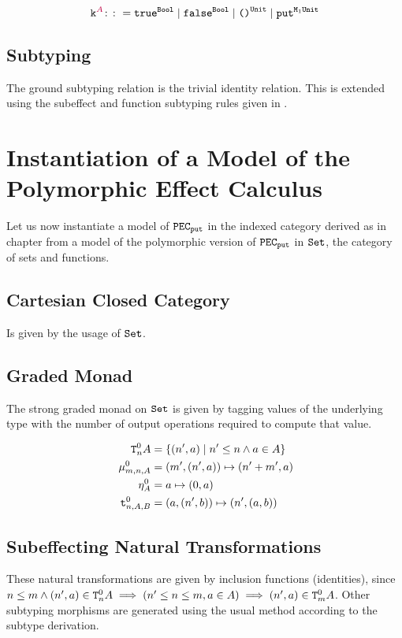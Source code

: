 \documentclass{Report}
\newcommand{\pecput}[0]{\texttt{PEC}_\put}
\begin{document}
    \begin{equation}
        \label{AdequacyConstants}
        \texttt{k}^{\color{purple} A} \colon\colon= \texttt{true}^{\texttt{Bool}} \mid \texttt{false}^{\texttt{Bool}} \mid \texttt{()}^{\texttt{Unit}} \mid \texttt{put}^{\texttt{M}_{1}{\texttt{Unit}}}        
    \end{equation}

    \subsection{Subtyping}
    The ground subtyping relation is the trivial identity relation. This is extended using the subeffect and function subtyping rules given in .


    \section{Instantiation of a Model of the Polymorphic Effect Calculus}

    Let us now instantiate a model of $\pecput$ in the indexed category derived as in chapter  from a model of the polymorphic version of $\pecput$ in $\texttt{Set}$, the category of sets and functions.

    \subsection{Cartesian Closed Category}
    Is given by the usage of $\texttt{Set}$.
    
    \subsection{Graded Monad}
    The strong graded monad on $\texttt{Set}$ is given by tagging values of the underlying type with the number of output operations required to compute that value.

    \begin{align}
        \label{AdequacyGradedMonad}
        \texttt{T}^0_{n}A & = \{(n', a) \mid n'\leq n\wedge a\in A \}\\
        \mu_{m, n, A}^0 & = (m', (n', a))\mapsto (n' + m', a)\\
        \eta_{A}^0 & = a\mapsto (0, a)\\\
        \texttt{t}_{n, A, B}^0 & = (a, (n', b)) \mapsto (n', (a, b))
    \end{align}


\subsection{Subeffecting Natural Transformations}
These natural transformations are given by inclusion functions (identities), since $n\leq m\wedge (n',a)\in\texttt{T}^0_{n}A \implies (n'\leq n \leq m, a\in A)\implies (n',a)\in\texttt{T}^0_{m}A$. Other subtyping morphisms are generated using the usual method according to the subtype derivation.
\end{document}
